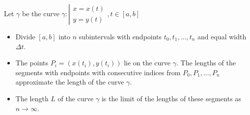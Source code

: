 
\begin{frame}
Let $\gamma $ be the curve 
$ \gamma: \left|
\begin{array}{rcl} 
x=x(t)\\
y=y(t)
\end{array}, t\in [a,b]
\right.$

\begin{itemize}
\item<2->  Divide $[a,b]$ into $n$ subintervals with endpoints $t_0, t_1, \ldots , t_n$ and equal width $\Delta t$.
\item<3->  The points $P_i = (x(t_i), y(t_i))$ lie on the curve $\gamma$. The lengths of the segments with endpoints with consecutive indices from $P_0, P_1, \ldots , P_n$ approximate the length of the curve $\gamma$.
\item<4->  The length $L$ of the curve $\gamma$ is the limit of the lengths of these segments as $n\rightarrow \infty$.
\end{itemize}
\begin{columns}[c]
\begin{center}
\ %
%
\end{center}
\end{columns}
\end{frame}
